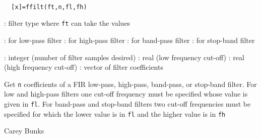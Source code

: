
\begin{mandesc}
   \\ %
\end{mandesc}
\begin{calling_sequence}
\begin{verbatim}
  [x]=ffilt(ft,n,fl,fh)  
\end{verbatim}
\end{calling_sequence}
\begin{parameters}
  \begin{varlist}
    : filter type where \verb!ft! can take the values
    \begin{varlist}
      : for low-pass filter
      : for high-pass filter
      : for band-pass filter
      : for stop-band filter
    \end{varlist}
    : integer (number of filter samples desired)
    : real (low frequency cut-off)
    : real (high frequency cut-off)
    : vector of filter coefficients
  \end{varlist}
\end{parameters}
\begin{mandescription}
  Get \verb!n! coefficients of a FIR low-pass,
  high-pass, band-pass, or stop-band filter.
  For low and high-pass filters one cut-off
  frequency must be specified whose value is
  given in \verb!fl!. For band-pass and stop-band
  filters two cut-off frequencies must be
  specified for which the lower value is in
  \verb!fl! and the higher value is in \verb!fh!
\end{mandescription}
\begin{authors}
    Carey Bunks  
\end{authors}
